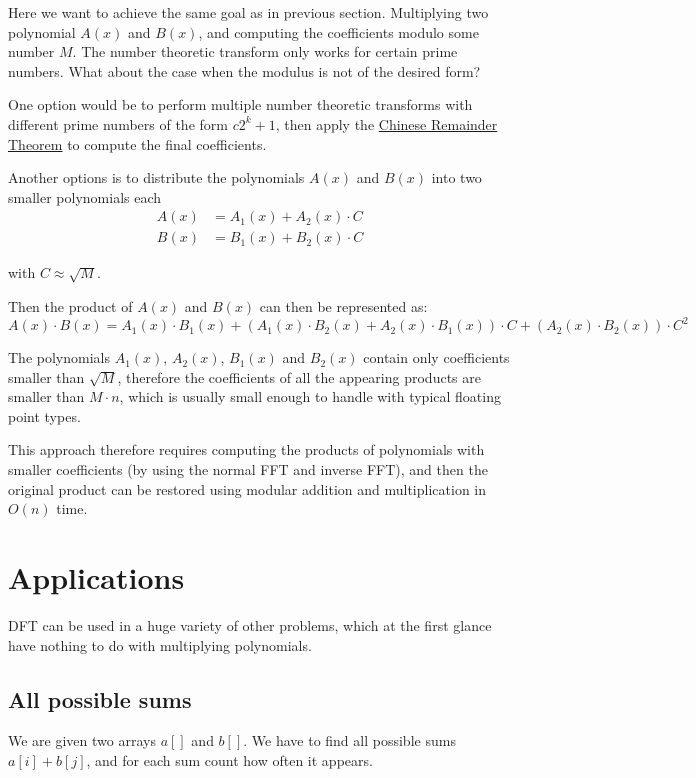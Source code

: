 \documentclass{article}
\begin{document}
Here we want to achieve the same goal as in previous section. Multiplying two polynomial $A(x)$ and $B(x)$, and computing the coefficients modulo some number $M$. The number theoretic transform only works for certain prime numbers. What about the case when the modulus is not of the desired form?

One option would be to perform multiple number theoretic transforms with different prime numbers of the form $c 2^k + 1$, then apply the \href{https://cp-algorithms.com/algebra/chinese-remainder-theorem.html}{Chinese Remainder Theorem} to compute the final coefficients.

Another options is to distribute the polynomials $A(x)$ and $B(x)$ into two smaller polynomials each
$$\begin{align} A(x) &= A_1(x) + A_2(x) \cdot C \\ B(x) &= B_1(x) + B_2(x) \cdot C \end{align}$$

with $C \approx \sqrt{M}$.

Then the product of $A(x)$ and $B(x)$ can then be represented as:
$$A(x) \cdot B(x) = A_1(x) \cdot B_1(x) + \left(A_1(x) \cdot B_2(x) + A_2(x) \cdot B_1(x)\right)\cdot C + \left(A_2(x) \cdot B_2(x)\right)\cdot C^2$$

The polynomials $A_1(x)$, $A_2(x)$, $B_1(x)$ and $B_2(x)$ contain only coefficients smaller than $\sqrt{M}$, therefore the coefficients of all the appearing products are smaller than $M \cdot n$, which is usually small enough to handle with typical floating point types.

This approach therefore requires computing the products of polynomials with smaller coefficients (by using the normal FFT and inverse FFT), and then the original product can be restored using modular addition and multiplication in $O(n)$ time.

\section{Applications}

DFT can be used in a huge variety of other problems, which at the first glance have nothing to do with multiplying polynomials.

\subsection{All possible sums}

We are given two arrays $a[]$ and $b[]$. We have to find all possible sums $a[i] + b[j]$, and for each sum count how often it appears.
\end{document}
